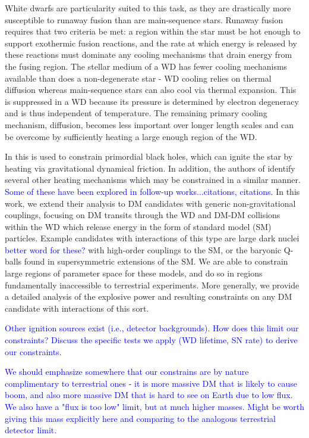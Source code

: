 \documentclass[twocolumn,showpacs,preprintnumbers,amsmath,amssymb,prd]{revtex4}
\begin{document}
White dwarfs are particularity suited to this task, as they are drastically more susceptible to runaway fusion than are main-sequence stars.  Runaway fusion requires that two criteria be met: a region within the star must be hot enough to support exothermic fusion reactions, and the rate at which energy is released by these reactions must dominate any cooling mechanisms that drain energy from the fusing region.  The stellar medium of a WD has fewer cooling mechanisms available than does a non-degenerate star - WD cooling relies on thermal diffusion whereas main-sequence stars can also cool via thermal expansion.  This is suppressed in a WD because its pressure is determined by electron degeneracy and is thus independent of temperature.  The remaining primary cooling mechanism, diffusion, becomes less important over longer length scales and can be overcome by sufficiently heating a large enough region of the WD. 

In \cite{Graham:2015apa} this is used to constrain primordial black holes, which can ignite the star by heating via gravitational dynamical friction.  In addition, the authors of \cite{Graham:2015apa} identify several other heating mechanisms which may be constrained in a similar manner.  \textcolor{blue}{Some of these have been explored in follow-up works...citations, citations.}  In this work, we extend their analysis to DM candidates with generic non-gravitational couplings, focusing on DM transits through the WD and DM-DM collisions within the WD which release energy in the form of standard model (SM) particles.
Example candidates with interactions of this type are large dark nuclei \textcolor{blue}{better word for these?} with high-order couplings to the SM, or the baryonic Q-balls found in supersymmetric extensions of the SM.  We are able to constrain large regions of parameter space for these models, and do so in regions fundamentally inaccessible to terrestrial experiments. More generally, we provide a detailed analysis of the explosive power and resulting constraints on any DM candidate with interactions of this sort. 

\textcolor{blue}{Other ignition sources exist (i.e., detector backgrounds). How does this limit our constraints? Discuss the specific tests we apply (WD lifetime, SN rate) to derive our constraints.}

\textcolor{blue}{We should emphasize somewhere that our constrains are by nature complimentary to terrestrial ones - it is more massive DM that is likely to cause boom, and also more massive DM that is hard to see on Earth due to low flux.  We also have a "flux is too low" limit, but at much higher masses.  Might be worth giving this mass explicitly here and comparing to the analogous terrestrial detector limit.}
\end{document}
